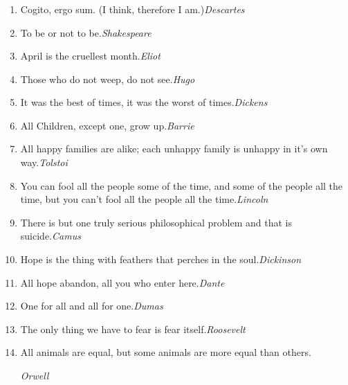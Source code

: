 \documentclass[UTF8,11pt,colorlinks,compress,openany]{beamer}%
\begin{document}
\begin{frame}\frametitle{}
\begin{enumerate}
\item Cogito, ergo sum. (I think, therefore I am.)\hfill \textsl{Descartes}
\item To be or not to be.\hfill \textsl{Shakespeare}
\item April is the cruellest month.\hfill \textsl{Eliot}
\item Those who do not weep, do not see.\hfill \textsl{Hugo}
\item It was the best of times, it was the worst of times.\hfill \textsl{Dickens}
\item All Children, except one, grow up.\hfill \textsl{Barrie}
\item All happy families are alike; each unhappy family is unhappy in it's own way.\hfill \textsl{Tolstoi}
\item You can fool all the people some of the time, and some of the people all the time, but you can't fool all the people all the time.\hfill \textsl{Lincoln}
\item There is but one truly serious philosophical problem and that is suicide.\hfill \textsl{Camus}
\item Hope is the thing with feathers that perches in the soul.\hfill \textsl{Dickinson}
\item All hope abandon, all you who enter here.\hfill \textsl{Dante}
\item One for all and all for one.\hfill \textsl{Dumas}
\item The only thing we have to fear is fear itself.\hfill \textsl{Roosevelt}
\item All animals are equal, but some animals are more equal than others.\par\hfill \textsl{Orwell}
\end{enumerate}
\end{frame}
\end{document}
